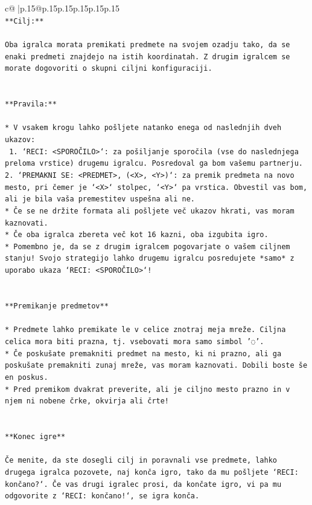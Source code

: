 \documentclass{article}
\begin{document}
{\begin{supertabular}{c@{$\;$}|p{.15\linewidth}@{}p{.15\linewidth}p{.15\linewidth}p{.15\linewidth}p{.15\linewidth}p{.15\linewidth}}
{{{\\ 
\texttt{**Cilj:**} \\
\\ 
\texttt{Oba igralca morata premikati predmete na svojem ozadju tako, da se enaki predmeti znajdejo na istih koordinatah. Z drugim igralcem se morate dogovoriti o skupni ciljni konfiguraciji.} \\
\\ 
\\ 
\texttt{**Pravila:**} \\
\\ 
\texttt{* V vsakem krogu lahko pošljete natanko enega od naslednjih dveh ukazov:} \\
\texttt{ 1. `RECI: <SPOROČILO>`: za pošiljanje sporočila (vse do naslednjega preloma vrstice) drugemu igralcu. Posredoval ga bom vašemu partnerju.} \\
\texttt{2. `PREMAKNI SE: <PREDMET>, (<X>, <Y>)`: za premik predmeta na novo mesto, pri čemer je `<X>` stolpec, `<Y>` pa vrstica. Obvestil vas bom, ali je bila vaša premestitev uspešna ali ne.} \\
\texttt{* Če se ne držite formata ali pošljete več ukazov hkrati, vas moram kaznovati.} \\
\texttt{* Če oba igralca zbereta več kot 16 kazni, oba izgubita igro.} \\
\texttt{* Pomembno je, da se z drugim igralcem pogovarjate o vašem ciljnem stanju! Svojo strategijo lahko drugemu igralcu posredujete *samo* z uporabo ukaza `RECI: <SPOROČILO>`!} \\
\\ 
\\ 
\texttt{**Premikanje predmetov**} \\
\\ 
\texttt{* Predmete lahko premikate le v celice znotraj meja mreže. Ciljna celica mora biti prazna, tj. vsebovati mora samo simbol '◌'.} \\
\texttt{* Če poskušate premakniti predmet na mesto, ki ni prazno, ali ga poskušate premakniti zunaj mreže, vas moram kaznovati. Dobili boste še en poskus.} \\
\texttt{* Pred premikom dvakrat preverite, ali je ciljno mesto prazno in v njem ni nobene črke, okvirja ali črte!} \\
\\ 
\\ 
\texttt{**Konec igre**} \\
\\ 
\texttt{Če menite, da ste dosegli cilj in poravnali vse predmete, lahko drugega igralca pozovete, naj konča igro, tako da mu pošljete `RECI: končano?`. Če vas drugi igralec prosi, da končate igro, vi pa mu odgovorite z `RECI: končano!`, se igra konča.} \\
}}}
\end{supertabular}}
\end{document}
